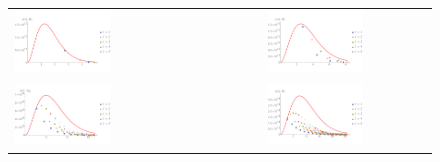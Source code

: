 \documentclass[compress]{beamer}
\begin{document}
    \begin{frame}

        \begin{figure}[h]
            \centering
            \begin{tabular}{ l c r }
                \includegraphics[width=0.5\textwidth]{plank_small_t_1} & \includegraphics[width=0.5\textwidth]{plank_small_t_2} \\
                \includegraphics[width=0.5\textwidth]{plank_small_t_3} & \includegraphics[width=0.5\textwidth]{plank_small_t_4} \\
            \end{tabular}
        \end{figure}

    \end{frame}
\end{document}
